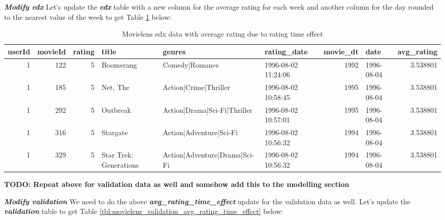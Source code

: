 \documentclass[
]{article}
\begin{document}
\textbf{\emph{Modify edx}} Let's update the \textbf{\emph{edx}} table
with a new column for the average rating for each week and another
column for the day rounded to the nearest value of the week to get Table
\ref{tbl:movielens_edx_avg_rating_time_effect} below:

\begin{table}[H]

\caption{\label{tab:rd_2}Movielens edx data with average rating due to rating time effect\label{tbl:movielens_edx_avg_rating_time_effect}}
\centering
\fontsize{6}{8}\selectfont
\begin{tabular}[t]{rrrlllrlr}
\toprule
userId & movieId & rating & title & genres & rating\_date & movie\_dt & date & avg\_rating\\
\midrule
1 & 122 & 5 & Boomerang & Comedy|Romance & 1996-08-02 11:24:06 & 1992 & 1996-08-04 & 3.538801\\
1 & 185 & 5 & Net, The & Action|Crime|Thriller & 1996-08-02 10:58:45 & 1995 & 1996-08-04 & 3.538801\\
1 & 292 & 5 & Outbreak & Action|Drama|Sci-Fi|Thriller & 1996-08-02 10:57:01 & 1995 & 1996-08-04 & 3.538801\\
1 & 316 & 5 & Stargate & Action|Adventure|Sci-Fi & 1996-08-02 10:56:32 & 1994 & 1996-08-04 & 3.538801\\
1 & 329 & 5 & Star Trek: Generations & Action|Adventure|Drama|Sci-Fi & 1996-08-02 10:56:32 & 1994 & 1996-08-04 & 3.538801\\
\bottomrule
\end{tabular}
\end{table}

\textbf{TODO: Repeat above for validation data as well and somehow add
this to the modelling section}

\textbf{\emph{Modify validation}} We need to do the above
\textbf{\emph{avg\_rating\_time\_effect}} update for the validation data
as well. Let's update the \textbf{\emph{validation}} table to get Table
\ref{tbl:movielens_validation_avg_rating_time_effect} below:
\end{document}
